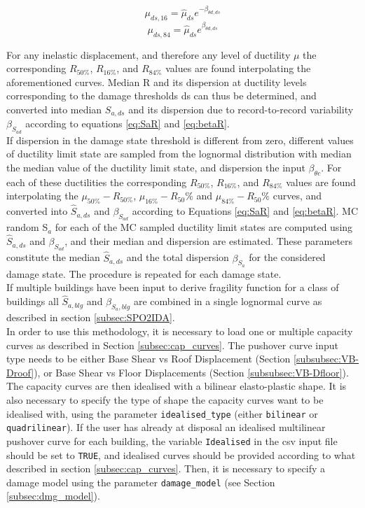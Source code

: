 \begin{equation}
\mu_{ds,16} = \hat{\mu}_{ds} e^{-\beta_{\theta d,ds}}
\label{eq:mu16-beta}
\end{equation}
\begin{equation}
\mu_{ds,84} = \hat{\mu}_{ds} e^{\beta_{\theta d,ds}}
\label{eq:mu84-beta}
\end{equation}

For any inelastic displacement, and therefore any level of ductility $\mu$ the corresponding $R_{50\%}$, $R_{16\%}$, and $R_{84\%}$ values are found interpolating the aforementioned curves. Median R and its dispersion at ductility levels corresponding to the damage thresholds ds can thus be determined, and converted into median $S_{a, ds}$ and its dispersion due to record-to-record variability $\beta_{S_{a d}}$ according to equations \ref{eq:SaR} and \ref{eq:betaR}. \\

If dispersion in the damage state threshold is different from zero, different values of ductility limit state are sampled from the lognormal distribution with median the median value of the ductility limit state, and dispersion the input $\beta_{\theta c}$. For each of these ductilities the corresponding $R_{50\%}$, $R_{16\%}$, and $R_{84\%}$ values are found interpolating the $\mu_{50\%}-R_{50\%}$, $\mu_{16\%}-R_50\%$ and $\mu_{84\%}-R_50\%$ curves, and converted into $\hat{S}_{a,ds}$ and $\beta_{S_{a d}}$ according to Equations \ref{eq:SaR} and \ref{eq:betaR}. MC random S$_a$ for each of the MC sampled ductility limit states are computed using $\hat{S}_{a,ds}$ and $\beta_{S_{a d}}$, and their median and dispersion are estimated. These parameters constitute the median $\hat{S}_{a,ds}$ and the total dispersion $\beta_{S_a}$ for the considered damage state. The procedure is repeated for each damage state.\\

 If multiple buildings have been input to derive fragility function for a class of buildings all $\hat{S}_{a, blg}$ and $\beta_{S_a, blg}$ are combined in a single lognormal curve as described in section \ref{subsec:SPO2IDA}. \\
 
In order to use this methodology, it is necessary to load one or multiple capacity curves as described in Section \ref{subsec:cap_curves}. The pushover curve input type needs to be either Base Shear vs Roof Displacement (Section \ref{subsubsec:VB-Droof}), or Base Shear vs Floor Displacements (Section \ref{subsubsec:VB-Dfloor}). The capacity curves are then idealised with a bilinear elasto-plastic shape. It is also necessary to specify the type of shape the capacity curves want to be idealised with, using the parameter \verb=idealised_type= (either \verb=bilinear= or \verb=quadrilinear=). If the user has already at disposal an idealised multilinear pushover curve for each building, the variable \verb=Idealised= in the csv input file should be set to \verb=TRUE=, and idealised curves should be provided according to what described in section \ref{subsec:cap_curves}. Then, it is necessary to specify a damage model using the parameter \verb=damage_model= (see Section \ref{subsec:dmg_model}).


